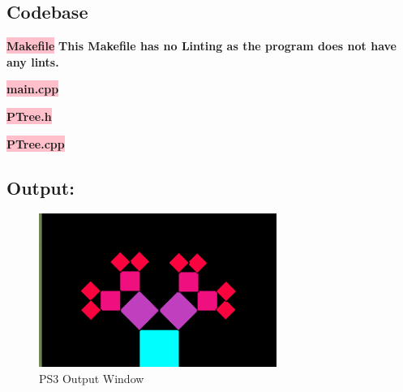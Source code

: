 \subsection{Codebase}\label{sec:ps3:code}

\textbf{\colorbox{pink}{Makefile}} \newline \textbf{This Makefile has no Linting as the program does not have any lints.}


\textbf{\colorbox{pink}{main.cpp}} 


\textbf{\colorbox{pink}{PTree.h}} 


\textbf{\colorbox{pink}{PTree.cpp}} 




\subsection{Output:}
\begin{figure}[h]
   \centering
    \includegraphics[width=0.69\textwidth]{projectPictures/ps3.png}
    \caption{PS3 Output Window}
    \label{fig:ps3}
\end{figure}

\newpage
